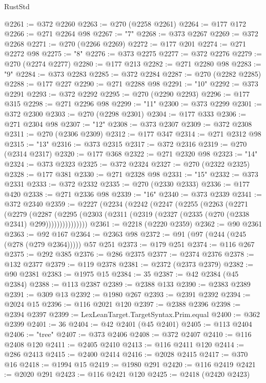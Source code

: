 \begin{lexlean}{RustStd}
\begin{coremodule}
@2261 := @372 @2260
@2263 := @270 (@2258 @2261)
@2264 := @177 @172
@2266 := @271 @2264 @98
@2267 := "7"
@2268 := @373 @2267
@2269 := @372 @2268
@2271 := @270 (@2266 @2269)
@2272 := @177 @201
@2274 := @271 @2272 @98
@2275 := "8"
@2276 := @373 @2275
@2277 := @372 @2276
@2279 := @270 (@2274 @2277)
@2280 := @177 @213
@2282 := @271 @2280 @98
@2283 := "9"
@2284 := @373 @2283
@2285 := @372 @2284
@2287 := @270 (@2282 @2285)
@2288 := @177 @227
@2290 := @271 @2288 @98
@2291 := "10"
@2292 := @373 @2291
@2293 := @372 @2292
@2295 := @270 (@2290 @2293)
@2296 := @177 @315
@2298 := @271 @2296 @98
@2299 := "11"
@2300 := @373 @2299
@2301 := @372 @2300
@2303 := @270 (@2298 @2301)
@2304 := @177 @333
@2306 := @271 @2304 @98
@2307 := "12"
@2308 := @373 @2307
@2309 := @372 @2308
@2311 := @270 (@2306 @2309)
@2312 := @177 @347
@2314 := @271 @2312 @98
@2315 := "13"
@2316 := @373 @2315
@2317 := @372 @2316
@2319 := @270 (@2314 @2317)
@2320 := @177 @368
@2322 := @271 @2320 @98
@2323 := "14"
@2324 := @373 @2323
@2325 := @372 @2324
@2327 := @270 (@2322 @2325)
@2328 := @177 @381
@2330 := @271 @2328 @98
@2331 := "15"
@2332 := @373 @2331
@2333 := @372 @2332
@2335 := @270 (@2330 @2333)
@2336 := @177 @420
@2338 := @271 @2336 @98
@2339 := "16"
@2340 := @373 @2339
@2341 := @372 @2340
@2359 := @2227
    (@2234
      (@2242
        (@2247
          (@2255
            (@2263
              (@2271
                (@2279
                  (@2287
                    (@2295
                      (@2303 (@2311 (@2319 (@2327 (@2335 (@270 (@2338 @2341) @299)))))))))))))))
@2361 := @2218 (@2220 @2359)
@2362 := @90 @2361
@2363 := @92 @167
@2364 := @2363 @98
@2372 := @91 (@97 (@244 (@245 (@278 (@279 @2364))))) @57 @251
@2373 := @179 @251
@2374 := @116 @267
@2375 := @292 @385
@2376 := @286 @2375
@2377 := @2374 @2376
@2378 := @132 @2377
@2379 := @119 @2378
@2381 := @2372 (@2373 @2379)
@2382 := @90 @2381
@2383 := @1975 @15
@2384 := 35
@2387 := @42 @2384 (@45 @2384)
@2388 := @113 @2387
@2389 := @2388 @133
@2390 := @2383 @2389
@2391 := @309 @13
@2392 := @1980 @267
@2393 := @2391 @2392
@2394 := @2024 @15
@2396 := @116 @2021 @120
@2397 := @2388 @2396
@2398 := @2394 @2397
@2399 := LexLeanTarget.TargetSyntax.Prim.equal
@2400 := @362 @2399
@2401 := 36
@2404 := @42 @2401 (@45 @2401)
@2405 := @113 @2404
@2406 := "tree"
@2407 := @373 @2406
@2408 := @372 @2407
@2410 := @116 @2408 @120
@2411 := @2405 @2410
@2413 := @116 @2411 @120
@2414 := @286 @2413
@2415 := @2400 @2414
@2416 := @2028 @2415
@2417 := @370 @16
@2418 := @1994 @15
@2419 := @1980 @291
@2420 := @116 @2419
@2421 := @2020 @291
@2423 := @116 @2421 @120
@2425 := @2418 (@2420 @2423)

\end{coremodule}
\end{lexlean}

